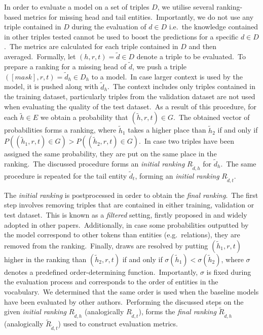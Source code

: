 \documentclass[longabstract, english, mgr]{iithesis}
\theoremstyle{default_theorem_style}\newtheorem{theorem}{Theorem}
\theoremstyle{default_theorem_style}\newtheorem{definition}{Definition}
\begin{document}
\noindent In order to evaluate a model on a set of triples $D$, we utilise several ranking-based
metrics for missing head and tail entities.\ Importantly, we do not use any triple contained in $D$ during the
evaluation of $d \in D$ i.e.\ the knowledge contained in other triples tested cannot be used to boost the predictions
for a specific $d \in D$.\ The metrics are calculated for each triple contained in $D$ and then averaged.\ Formally,
let $(h, r, t) = \tilde{d} \in D$ denote a triple to be evaluated.\ To prepare a ranking for a missing head of
$\tilde{d}$, we push a triple $([mask], r, t) = \tilde{d}_h \in D_h$ to a model.\ In case larger context is used by
the model, it is pushed along with $\tilde{d}_h$.\ The context includes only triples contained in the training
dataset, particularly triples from the validation dataset are not used when evaluating the quality of the test
dataset.\ As a result of this procedure, for each $\tilde{h} \in E$ we obtain a probability that
$(\tilde{h}, r, t) \in G$.\ The obtained vector of probabilities forms a ranking, where $\tilde{h}_1$ takes a higher
place than $\tilde{h}_2$ if and only if $P((\tilde{h}_1, r, t) \in G) > P((\tilde{h}_2, r, t) \in G)$.\ In case two
triples have been assigned the same probability, they are put on the same place in the ranking.\ The discussed procedure
forms an \textit{initial ranking} $R_{\tilde{d}, h}$ for $\tilde{d}_h$.\ The same procedure is repeated for
the tail entity $\tilde{d}_t$, forming an \textit{initial ranking} $R_{\tilde{d}, t}$.\newline

\noindent The \textit{initial ranking} is postprocessed in order to obtain the \textit{final ranking}.\ The first
step involves removing triples that are contained in either training, validation or test
dataset.\ This is known as a \textit{filtered} setting, firstly proposed in \cite{transe_model} and widely adopted in
other papers.\ Additionally, in case some probabilities outputted by the model correspond to other tokens than entities
(e.g.\ relations), they are removed from the ranking.\ Finally, draws are resolved by putting $(\tilde{h}_1, r, t)$
higher in the ranking than $(\tilde{h}_2, r, t)$ if and only if $\sigma(\tilde{h}_1) < \sigma(\tilde{h}_2)$, where
$\sigma$ denotes a predefined order-determining function.\ Importantly, $\sigma$ is fixed during the evaluation process
and corresponds to the order of entities in the vocabulary.\ We determined that the same order is used when the baseline
models have been evaluated by other authors.\ Performing the discussed steps on the given \textit{initial ranking}
$R_{\tilde{d}, h}$ (analogically $R_{\tilde{d}, t}$), forms the \textit{final ranking}
$\tilde{R}_{\tilde{d}, h}$ (analogically $\tilde{R}_{\tilde{d}, t}$) used to construct evaluation metrics.\newline
\end{document}
